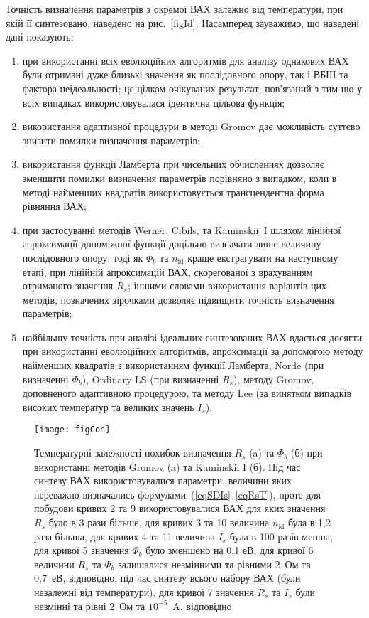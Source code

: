 Точність визначення параметрів з окремої ВАХ залежно від температури, при якій її синтезовано, наведено на рис.~\ref{figId}.
Насамперед зауважимо, що наведені дані показують:
\begin{enumerate}[label=\asbuk*),leftmargin=0em,itemindent=1.5em]
\item при використанні всіх еволюційних алгоритмів для аналізу однакових ВАХ були отримані дуже близькі значення як послідовного опору, так і ВБШ та фактора неідеальності;
це цілком очікуваних результат, пов'язаний з тим що у всіх випадках використовувалася ідентична цільова функція;
\item використання адаптивної процедури в методі Gromov дає можливість суттєво знизити помилки визначення параметрів;
\item використання функції Ламберта при чисельних обчисленнях дозволяє зменшити помилки визначення параметрів порівняно з випадком, коли в методі найменших квадратів використовується трансцендентна форма рівняння ВАХ;
\item при застосуванні методів Werner, Cibils, та Kaminskii~I шляхом лінійної апроксимації допоміжної функції доцільно визначати лише величину послідовного опору,
тоді як $\Phi_b$ та $n_\mathrm{id}$ краще екстрагувати на наступному етапі, при лінійній апроксимацій ВАХ, скорегованої з врахуванням  отриманого значення $R_s$;
іншими словами використання варіантів цих методів, позначених зірочками дозволяє підвищити точність визначення параметрів;
\item найбільшу точність при аналізі ідеальних синтезованих ВАХ вдається досягти при використанні еволюційних алгоритмів, апроксимації за допомогою методу найменших квадратів з використанням функції Ламберта, Norde (при визначенні $\Phi_b$), Ordinary LS (при визначенні $R_s$), методу Gromov, доповненого адаптивною процедурою, та методу Lee (за винятком випадків високих температур та великих значень $I_s$).
\end{enumerate}




\begin{figure}
\center
\texttt{[image: figCon]}%
\caption{\label{figCon}
Температурні залежності похибок визначення $R_s$ (a) та $\Phi_b$ (б) при використанні методів Gromov (a) та  Kaminskii I (б).
Під час синтезу ВАХ використовувалися параметри, величини яких переважно визначались формулами~(\ref{eqSDIs}--\ref{eqRsT}),
проте для  побудови кривих 2 та 9 використовувалися ВАХ для яких значення $R_s$ було в 3 рази більше,
для кривих 3 та 10 величина $n_\mathrm{id}$ була в 1,2 раза більша,
для кривих 4 та 11 величина $I_s$ була в 100 разів менша,
для кривої 5 значення $\Phi_b$ було зменшено на 0,1 еВ,
для кривої 6 величини $R_s$ та $\Phi_b$ залишалися незмінними та рівними 2~Ом та 0,7~еВ, відповідно, під час синтезу всього
набору ВАХ (були незалежні від температури),
для кривої 7 значення $R_s$ та $I_s$ були незмінні та рівні 2~Ом та $10^{-5}$~A, відповідно
}
\end{figure}

